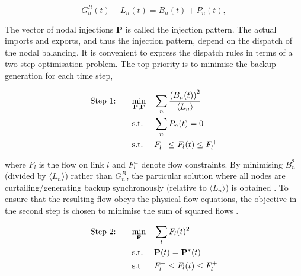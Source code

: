 \documentclass[a4paper, 5p, sort&compress]{elsarticle}%
\newcommand{\mean}[1]{\langle #1 \rangle}
\newcommand{\paren}[1]{\left(#1\right)}
\begin{document}
\begin{equation}
  \label{eq:nodal-balancing}
  G^{R}_{n}(t) - L_{n}(t) = B_{n}(t) + P_{n}(t), %
\end{equation}

The vector of nodal injections $\mathbf{P}$ is called the injection
pattern. The actual imports and exports, and thus the injection
pattern, depend on the dispatch of the nodal balancing. It is
convenient to express the dispatch rules in terms of a two step
optimisation problem. The top priority is to minimise the backup
generation for each time step,

\begin{equation}
  \label{eq:step1}
  \begin{aligned}
    \text{Step 1: \hspace{15pt}}& \underset{\mathbf{P}, \mathbf{F}}{\text{min}}
    & & \sum_{n} \frac{\paren{B_{n}(t)}^{2}}{\mean{L_{n}}} \\
    & \text{s.t.}
    & & \sum_{n} P_{n} (t) = 0 \\ %
    & \text{s.t.}
    & & F_{l}^{-} \leq F_{l} (t) \leq F_{l}^{+}
  \end{aligned}
\end{equation}

where $F_{l}$ is the flow on link $l$ and $F_{l}^{\pm}$ denote flow
constraints. By minimising $B_{n}^{2}$ (divided by $\mean{L_{n}}$)
rather than $G_{n}^{B}$, the particular solution where all nodes are
curtailing/generating backup synchronously (relative to
$\mean{L_{n}}$) is obtained
\cite{Rolando2015}. %
To ensure that the resulting flow obeys the physical flow equations, the
objective in the second step is chosen to minimise the sum of squared flows
\cite{Magnus}.

\begin{equation}
  \begin{aligned}
    \label{eq:step2}
    \text{Step 2: \hspace{15pt}} & \underset{\mathbf{F}}{\text{min}}
    & & \sum_{l} F_{l}(t)^{2} \\
    & \text{s.t.}
    & & \mathbf{P}(t) = \mathbf{P}^{*}(t) \\ %
    & \text{s.t.}
    & & F_{l}^{-} \leq F_{l}(t) \leq F_{l}^{+} \\
  \end{aligned}
\end{equation}
\end{document}
